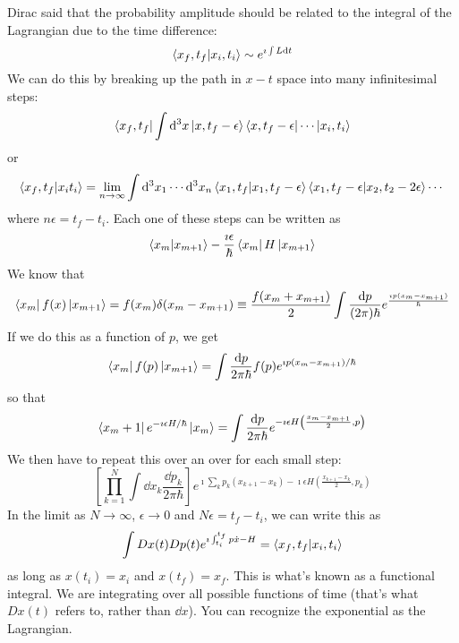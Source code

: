\documentclass[a4paper,twoside,master.tex]{subfiles}
\begin{document}
Dirac said that the probability amplitude should be related to the integral of the Lagrangian due to the time difference:
\begin{equation}
    \bra{x_f, t_f}\ket{x_i, t_i} \sim e^{\imath \int L \dd{t}}
\end{equation}
We can do this by breaking up the path in $ x-t $ space into many infinitesimal steps:
\begin{equation}
    \bra{x_f, t_f} \int \dd[3]{x}\ket{x, t_f - \epsilon}\bra{x, t_f - \epsilon} \cdots\ket{x_i, t_i}
\end{equation}
or
\begin{equation}
    \bra{x_f, t_f}\ket{x_i t_i} = \lim_{n \to \infty} \int \dd[3]{x_1} \cdots \dd[3]{x_n}\bra{x_1, t_f}\ket{x_1, t_f - \epsilon}\bra{x_1, t_f - \epsilon}\ket{x_2, t_2 - 2 \epsilon} \cdots 
\end{equation}
where $ n \epsilon = t_f - t_i $. Each one of these steps can be written as
\begin{equation}
    \bra{x_m}\ket{x_{m+1}} - \frac{\imath \epsilon}{\hbar}\bra{x_m} H\ket{x_{m+1}}
\end{equation}
We know that
\begin{equation}
    \bra{x_m} f(x)\ket{x_{m+1}} = f(x_m) \delta(x_m - x_{m+1}) \equiv \frac{f(x_m + x_{m+1})}{2} \int \frac{\dd{p}}{(2 \pi) \hbar} e^{\frac{\imath p (x_m - x_{m+1})}{\hbar}}
\end{equation}
If we do this as a function of $ p $, we get
\begin{equation}
    \bra{x_m} f(p)\ket{x_{m+1}} = \int \frac{\dd{p}}{2 \pi \hbar} f(p) e^{\imath p(x_m - x_{m+1}) / \hbar}
\end{equation}
so that
\begin{equation}
    \bra{x_m + 1} e^{- \imath \epsilon H / \hbar}\ket{x_m} = \int \frac{\dd{p}}{2 \pi \hbar} e^{- \imath \epsilon H \left( \frac{x_m - x_{m+1}}{2}, p \right)}
\end{equation}
We then have to repeat this over an over for each small step:
\begin{equation}
    \left[\prod_{k=1}^{N} \int \dd{x_k} \frac{\dd{p_k}}{2 \pi \hbar}\right] e^{\imath \sum_k p_k(x_{k +1} - x_k) - \imath \epsilon H \left( \frac{x_{k+1} - x_{k}}{2}, p_k \right)}
\end{equation}
In the limit as $ N \to \infty $, $ \epsilon \to 0 $ and $ N \epsilon = t_f - t_i $, we can write this as
\begin{equation}
    \int D x(t) D p(t) e^{\imath \int_{t_i}^{t_f} p\dot{x} - H} =\bra{x_f, t_f}\ket{x_i, t_i}
\end{equation}
as long as $ x(t_i) = x_i $ and $ x(t_f) = x_f $. This is what's known as a functional integral. We are integrating over all possible functions of time (that's what $ D x(t) $ refers to, rather than $ \dd{x} $). You can recognize the exponential as the Lagrangian.
\end{document}
